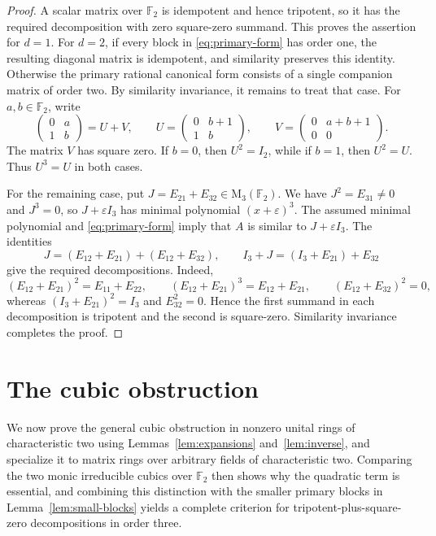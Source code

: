 \documentclass[12pt]{amsart}
\theoremstyle{remark}
\numberwithin{equation}{section}
\theoremstyle{definition}
\newcommand{\F}{\mathbb F}
\newcommand{\Mat}{\mathrm M}
\newcommand{\Id}{I}
\begin{document}
\begin{proof}
A scalar matrix over $\F_2$ is idempotent and hence tripotent, so it has the required decomposition with zero square-zero summand. This proves the assertion for $d=1$. For $d=2$, if every block in \eqref{eq:primary-form} has order one, the resulting diagonal matrix is idempotent, and similarity preserves this identity. Otherwise the primary rational canonical form consists of a single companion matrix of order two. By similarity invariance, it remains to treat that case. For $a,b\in\F_2$, write
\[
 \begin{pmatrix}0&a\\1&b\end{pmatrix}
 =U+V,\qquad
 U=\begin{pmatrix}0&b+1\\1&b\end{pmatrix},\qquad
 V=\begin{pmatrix}0&a+b+1\\0&0\end{pmatrix}.
\]
The matrix $V$ has square zero. If $b=0$, then $U^2=\Id_2$, while if $b=1$, then $U^2=U$. Thus $U^3=U$ in both cases.

For the remaining case, put $J=E_{21}+E_{32}\in\Mat_3(\F_2)$. We have $J^2=E_{31}\neq0$ and $J^3=0$, so $J+\varepsilon\Id_3$ has minimal polynomial $(x+\varepsilon)^3$. The assumed minimal polynomial and \eqref{eq:primary-form} imply that $A$ is similar to $J+\varepsilon\Id_3$. The identities
\[
 J=(E_{12}+E_{21})+(E_{12}+E_{32}),\qquad
 \Id_3+J=(\Id_3+E_{21})+E_{32}
\]
give the required decompositions. Indeed,
\[
 (E_{12}+E_{21})^2=E_{11}+E_{22},\qquad
 (E_{12}+E_{21})^3=E_{12}+E_{21},\qquad
 (E_{12}+E_{32})^2=0,
\]
whereas $(\Id_3+E_{21})^2=\Id_3$ and $E_{32}^2=0$. Hence the first summand in each decomposition is tripotent and the second is square-zero. Similarity invariance completes the proof.
\end{proof}

\section{The cubic obstruction}\label{sec:obstruction}

We now prove the general cubic obstruction in nonzero unital rings of characteristic two using Lemmas~\ref{lem:expansions} and~\ref{lem:inverse}, and specialize it to matrix rings over arbitrary fields of characteristic two. Comparing the two monic irreducible cubics over $\F_2$ then shows why the quadratic term is essential, and combining this distinction with the smaller primary blocks in Lemma~\ref{lem:small-blocks} yields a complete criterion for tripotent-plus-square-zero decompositions in order three.
\end{document}
